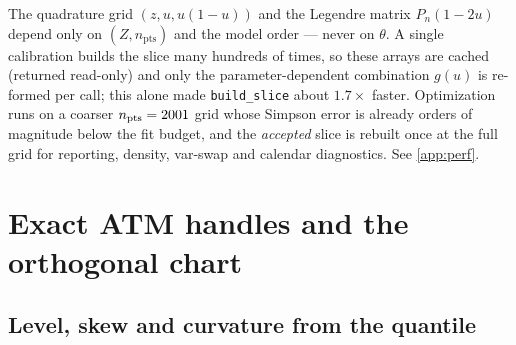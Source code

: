 \documentclass[11pt]{article}
\begin{document}
\begin{perfbox}
The quadrature grid $(z,u,u(1-u))$ and the Legendre matrix $P_n(1-2u)$ depend
only on $(Z,n_{\text{pts}})$ and the model order --- never on $\theta$. A single
calibration builds the slice many hundreds of times, so these arrays are cached
(returned read-only) and only the parameter-dependent combination $g(u)$ is
re-formed per call; this alone made \texttt{build\_slice} about $1.7\times$
faster. Optimization runs on a coarser $n_{\text{pts}}=2001$ grid whose
Simpson error is already orders of magnitude below the fit budget, and the
\emph{accepted} slice is rebuilt once at the full grid for reporting, density,
var-swap and calendar diagnostics. See \cref{app:perf}.
\end{perfbox}

\section{Exact ATM handles and the orthogonal chart}
\label{sec:atm}

\subsection{Level, skew and curvature from the quantile}
\label{sec:atm_exact}
\end{document}
